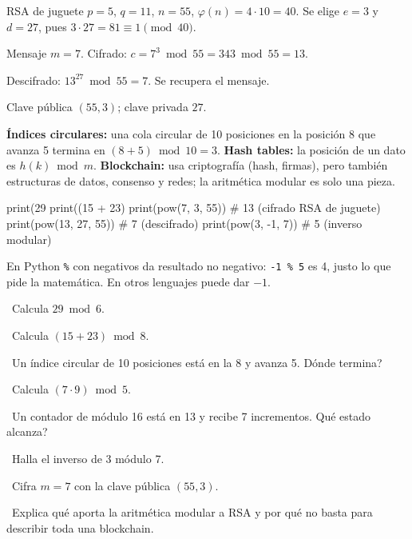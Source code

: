 \begin{tmejemplo}{RSA de juguete}
$p=5$, $q=11$, $n=55$, $\varphi(n)=4\cdot10=40$. Se elige $e=3$ y $d=27$, pues $3\cdot27=81\equiv1\pmod{40}$.
\begin{tmpasos}
\item Mensaje $m=7$. Cifrado: $c=7^3\bmod55=343\bmod55=13$.
\item Descifrado: $13^{27}\bmod55=7$. Se recupera el mensaje.
\item Clave p\'ublica $(55, 3)$; clave privada $27$.
\end{tmpasos}
\end{tmejemplo}

\begin{tmsistemas}
\textbf{\'Indices circulares:} una cola circular de 10 posiciones en la posici\'on 8 que avanza 5 termina en $(8+5)\bmod10=3$. \textbf{Hash tables:} la posici\'on de un dato es $h(k)\bmod m$. \textbf{Blockchain:} usa criptograf\'ia (hash, firmas), pero tambi\'en estructuras de datos, consenso y redes; la aritm\'etica modular es solo una pieza.
\end{tmsistemas}

\begin{tmcodigo}
print(29 %
print((15 + 23) %
print(pow(7, 3, 55))           # 13  (cifrado RSA de juguete)
print(pow(13, 27, 55))         # 7   (descifrado)
print(pow(3, -1, 7))           # 5   (inverso modular)
\end{tmcodigo}

\begin{tmcuidado}En Python \texttt{\%} con negativos da resultado no negativo: \texttt{-1 \% 5} es 4, justo lo que pide la matem\'atica. En otros lenguajes puede dar $-1$.\end{tmcuidado}

\begin{tmejercicios}
\label{ej:2-5}
\begin{tmlista}
\item \tmbasico\ Calcula $29\bmod6$.
\item \tmbasico\ Calcula $(15+23)\bmod8$.
\item \tmbasico\ Un \'indice circular de 10 posiciones est\'a en la 8 y avanza 5. \textquestiondown D\'onde termina?
\item \tmmedio\ Calcula $(7\cdot9)\bmod5$.
\item \tmmedio\ Un contador de m\'odulo 16 est\'a en 13 y recibe 7 incrementos. \textquestiondown Qu\'e estado alcanza?
\item \tmmedio\ Halla el inverso de 3 m\'odulo 7.
\item \tmdificil\ Cifra $m=7$ con la clave p\'ublica $(55, 3)$.
\item \tmdificil\ Explica qu\'e aporta la aritm\'etica modular a RSA y por qu\'e no basta para describir toda una blockchain.
\end{tmlista}
\end{tmejercicios}

